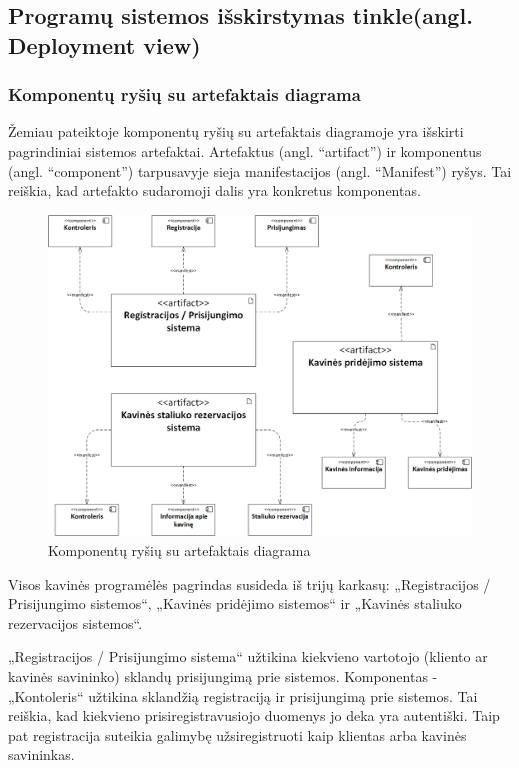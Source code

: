 \documentclass{VUMIFPSkursinis}
\begin{document}
\subsection{Programų sistemos išskirstymas tinkle(angl. Deployment view)}
\subsubsection{Komponentų ryšių su artefaktais diagrama}

Žemiau pateiktoje komponentų ryšių su artefaktais diagramoje yra išskirti pagrindiniai sistemos artefaktai. Artefaktus (angl. “artifact”) ir komponentus (angl. “component”) tarpusavyje sieja manifestacijos (angl. “Manifest”) ryšys. Tai reiškia, kad artefakto sudaromoji dalis yra konkretus komponentas.


\begin{figure}[H]
    \centering
    \includegraphics[width=\textwidth,height=\textheight,keepaspectratio]{img/Deployment_diagram1} 
    \caption{Komponentų ryšių su artefaktais diagrama}
    \label{img:Model}
\end{figure}




Visos kavinės programėlės pagrindas susideda iš trijų karkasų: „Registracijos / Prisijungimo sistemos“, „Kavinės pridėjimo sistemos“ ir „Kavinės staliuko rezervacijos sistemos“.

„Registracijos / Prisijungimo sistema“ užtikina kiekvieno vartotojo (kliento ar kavinės savininko) sklandų prisijungimą prie sistemos. Komponentas - „Kontoleris“ užtikina sklandžią registraciją ir prisijungimą prie sistemos. Tai reiškia, kad kiekvieno prisiregistravusiojo duomenys jo deka yra autentiški. Taip pat registracija suteikia galimybę užsiregistruoti kaip klientas arba kavinės savininkas.
\end{document}

